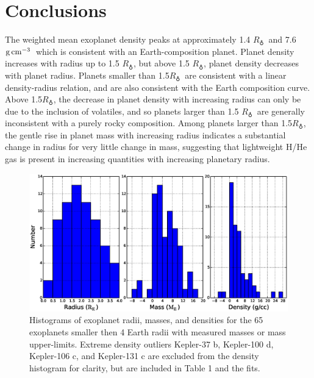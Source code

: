 \documentclass[iop]{emulateapj}
\newcommand{\gcmc}{\ensuremath{\rm g\,cm^{-3}}}
\newcommand{\gcc}{\gcmc}
\newcommand{\rearth}{\ensuremath{R_\earth}}
\begin{document}

\section{Conclusions}
The weighted mean exoplanet density peaks at approximately 1.4 \rearth\ and 7.6 \gcc\, which is consistent with an Earth-composition planet.  Planet density increases with radius up to 1.5 \rearth, but above 1.5 \rearth, planet density decreases with planet radius. Planets smaller than 1.5\rearth\ are consistent with a linear density-radius relation, and are also consistent with the \citet{Seager2007} Earth composition curve.  Above 1.5\rearth, the decrease in planet density with increasing radius can only be due to the inclusion of volatiles, and so planets larger than 1.5 \rearth\ are generally inconsistent with a purely rocky composition.  Among planets larger than 1.5\rearth, the gentle rise in planet mass with increasing radius indicates a substantial change in radius for very little change in mass, suggesting that lightweight H/He gas is present in increasing quantities with increasing planetary radius.



\begin{figure}[htbp] %
   \centering
   \includegraphics[width=7in]{histograms.eps} 
   \caption{\small Histograms of exoplanet radii, masses, and densities for the 65 exoplanets smaller then 4 Earth radii with measured masses or mass upper-limits.  Extreme density outliers Kepler-37 b, Kepler-100 d, Kepler-106 c, and Kepler-131 c are excluded from the density histogram for clarity, but are included in Table 1 and the fits.}
\label{fig:histograms}
\end{figure}
\end{document}
